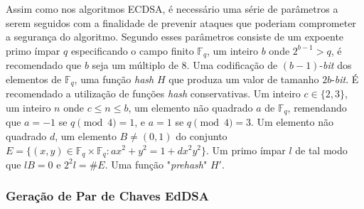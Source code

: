 Assim como nos algoritmos ECDSA, é necessário uma série de parâmetros a serem seguidos com a finalidade de prevenir ataques que poderiam comprometer a segurança do algoritmo. Segundo  esses parâmetros consiste de um expoente primo ímpar $q$ especificando o campo finito $\mathbb{F}_q$, um inteiro $b$ onde $2^{b-1} > q$, é recomendado que $b$ seja um múltiplo de 8. Uma codificação de $(b-1)$-\textit{bit} dos elementos de $\mathbb{F}_q$, uma função \textit{hash} $H$ que produza um valor de tamanho $2b$-\textit{bit}. É recomendado a utilização de funções \textit{hash} conservativas. Um inteiro $c \in \{2,3\}$, um inteiro $n$ onde $c \le n \le b$, um elemento não quadrado $a$ de $\mathbb{F}_q$, remendando que $a = -1$ se $q \pmod{4} = 1$, e $a = 1$ se $q \pmod{4} = 3$. Um elemento não quadrado $d$, um elemento $B \ne (0, 1)$ do conjunto $E = \big\{ (x, y) \in \mathbb{F}_q \times \mathbb{F}_q : ax^2 + y^2 = 1 + dx^2y^2 \big\}$. Um primo ímpar $l$ de tal modo que $lB = 0$ e $2^2l = \#E$. Uma função "\textit{prehash}" $H'$.

\subsubsection{Geração de Par de Chaves EdDSA}


